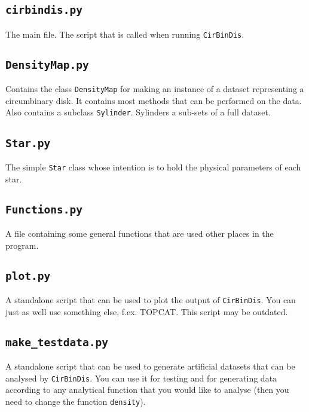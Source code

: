 \documentclass[a4paper, 12pt, english, titlepage]{article}
\newcommand{\sname}{\texttt{CirBinDis}\xspace}
\begin{document}
\subsection{\texttt{cirbindis.py}}
    The main file.
    The script that is called when running \sname.

\subsection{\texttt{DensityMap.py}}
    Contains the class \texttt{DensityMap} for making an instance of a dataset representing a circumbinary disk. It contains most methods that can be performed on the data. Also contains a subclass \texttt{Sylinder}. Sylinders a sub-sets of a full dataset.

\subsection{\texttt{Star.py}}
    The simple \texttt{Star} class whose intention is to hold the physical parameters of each star.

\subsection{\texttt{Functions.py}}
    A file containing some general functions that are used other places in the program.

\subsection{\texttt{plot.py}}
    A standalone script that can be used to plot the output of \sname. You can just as well use something else, f.ex. TOPCAT. This script may be outdated.

\subsection{\texttt{make\_testdata.py}}
    A standalone script that can be used to generate artificial datasets that can be analysed by \sname. You can use it for testing and for generating data according to any analytical function that you would like to analyse (then you need to change the function \texttt{density}).
\end{document}
